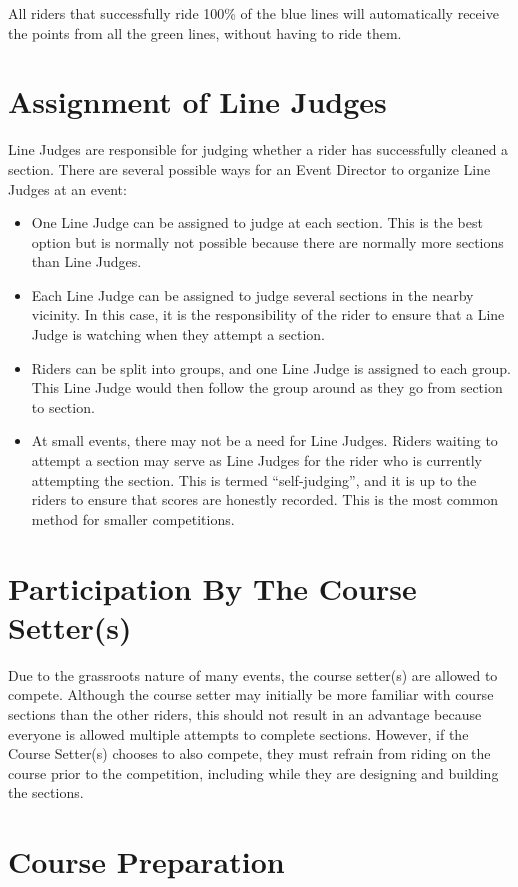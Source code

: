 All riders that successfully ride 100\% of the blue lines will automatically receive the points from all the green lines, without having to ride them.

\section{Assignment of Line Judges}
Line Judges are responsible for judging whether a rider has successfully cleaned a section.
There are several possible ways for an Event Director to organize Line Judges at an event:
\begin{itemize}
\item One Line Judge can be assigned to judge at each section.
This is the best option but is normally not possible because there are normally more sections than Line Judges.
\item Each Line Judge can be assigned to judge several sections in the nearby vicinity.
In this case, it is the responsibility of the rider to ensure that a Line Judge is watching when they attempt a section.
\item Riders can be split into groups, and one Line Judge is assigned to each group.
This Line Judge would then follow the group around as they go from section to section.
\item At small events, there may not be a need for Line Judges.
Riders waiting to attempt a section may serve as Line Judges for the rider who is currently attempting the section.
This is termed ``self-judging'', and it is up to the riders to ensure that scores are honestly recorded.
This is the most common method for smaller competitions.
\end{itemize}

\section{Participation By The Course Setter(s)}

Due to the grassroots nature of many events, the course setter(s) are allowed to compete.
Although the course setter may initially be more familiar with course sections than the other riders, this should not result in an advantage because everyone is allowed multiple attempts to complete sections.
However, if the Course Setter(s) chooses to also compete, they must refrain from riding on the course prior to the competition, including while they are designing and building the sections.

\section{Course Preparation}


